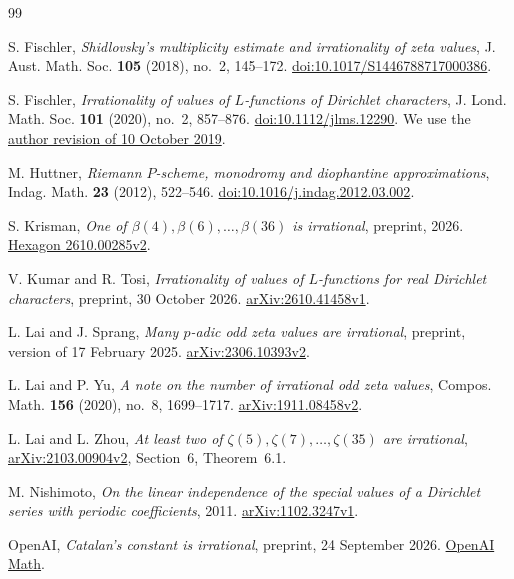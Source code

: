 \begin{thebibliography}{99}

S. Fischler,
\emph{Shidlovsky's multiplicity estimate and irrationality of zeta values},
J. Aust. Math. Soc. \textbf{105} (2018), no.~2, 145--172.
\href{https://doi.org/10.1017/S1446788717000386}
{doi:10.1017/S1446788717000386}.

S. Fischler,
\emph{Irrationality of values of $L$-functions of Dirichlet characters},
J. Lond. Math. Soc. \textbf{101} (2020), no.~2, 857--876.
\href{https://doi.org/10.1112/jlms.12290}{doi:10.1112/jlms.12290}.
We use the \href{https://www.imo.universite-paris-saclay.fr/~stephane.fischler/Lschi.pdf}
{author revision of 10 October 2019}.

M. Huttner,
\emph{Riemann $P$-scheme, monodromy and diophantine approximations},
Indag. Math. \textbf{23} (2012), 522--546.
\href{https://doi.org/10.1016/j.indag.2012.03.002}
{doi:10.1016/j.indag.2012.03.002}.

S. Krisman,
\emph{One of $\beta(4),\beta(6),\ldots,\beta(36)$ is irrational},
preprint, 2026.
\href{https://hexagonmath.org/abs/2610.00285v2}{Hexagon 2610.00285v2}.

V. Kumar and R. Tosi,
\emph{Irrationality of values of $L$-functions for real Dirichlet characters},
preprint, 30 October 2026.
\href{https://arxiv.org/abs/2610.41458v1}{arXiv:2610.41458v1}.

L. Lai and J. Sprang,
\emph{Many $p$-adic odd zeta values are irrational},
preprint, version of 17 February 2025.
\href{https://arxiv.org/abs/2306.10393v2}{arXiv:2306.10393v2}.

L. Lai and P. Yu,
\emph{A note on the number of irrational odd zeta values},
Compos. Math. \textbf{156} (2020), no.~8, 1699--1717.
\href{https://arxiv.org/abs/1911.08458v2}{arXiv:1911.08458v2}.

L. Lai and L. Zhou,
\emph{At least two of $\zeta(5),\zeta(7),\ldots,\zeta(35)$ are irrational},
\href{https://arxiv.org/abs/2103.00904v2}{arXiv:2103.00904v2},
Section~6, Theorem~6.1.

M. Nishimoto,
\emph{On the linear independence of the special values of a Dirichlet
series with periodic coefficients}, 2011.
\href{https://arxiv.org/abs/1102.3247v1}{arXiv:1102.3247v1}.

OpenAI,
\emph{Catalan's constant is irrational},
preprint, 24 September 2026.
\href{https://github.com/openai/math/blob/4eaee87548250b2682affda7d05d947c05554bae/preprints/Catalans-constant-is-irrational-September-24-2026/paper.pdf}
{OpenAI Math}.


\end{thebibliography}
